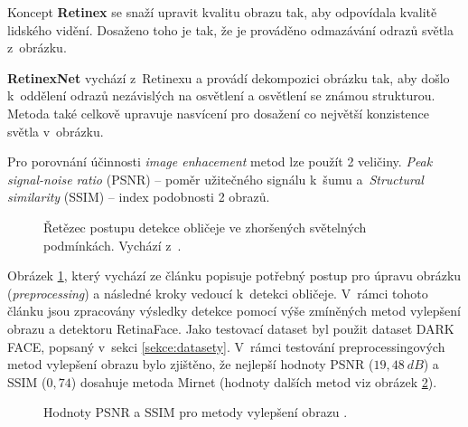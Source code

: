 Koncept \textbf{Retinex} se snaží upravit kvalitu obrazu tak, aby odpovídala kvalitě lidského vidění. Dosaženo toho je tak, že je prováděno odmazávání odrazů světla z~obrázku.

\textbf{RetinexNet} vychází z~Retinexu a provádí dekompozici obrázku tak, aby došlo k~oddělení odrazů nezávislých na osvětlení a osvětlení se známou strukturou. Metoda také celkově upravuje nasvícení pro dosažení co největší konzistence světla v~obrázku.

Pro porovnání účinnosti \emph{image enhacement} metod lze použít 2 veličiny. \emph{Peak signal-noise ratio} (PSNR) -- poměr užitečného signálu k~šumu a~\emph{Structural similarity} (SSIM) -- index podobnosti 2 obrazů.

\begin{figure}[H]
  \begin{center}
  \label{obrazek:iepostup}
  \caption{Řetězec postupu detekce obličeje ve zhoršených světelných podmínkách. Vychází z~\cite{lowLightFdReview}.}
  \end{center}
\end{figure}

Obrázek \ref{obrazek:iepostup}, který vychází ze článku \cite{lowLightFdReview} popisuje potřebný postup pro úpravu obrázku (\emph{preprocessing}) a následné kroky vedoucí k~detekci obličeje. V~rámci tohoto článku jsou zpracovány výsledky detekce pomocí výše zmíněných metod vylepšení obrazu a detektoru RetinaFace. Jako testovací dataset byl použit dataset DARK FACE, popsaný v~sekci \ref{sekce:datasety}. V~rámci testování preprocessingových metod vylepšení obrazu bylo zjištěno, že nejlepší hodnoty PSNR ($19,48\:dB$) a SSIM ($0,74$) dosahuje metoda Mirnet (hodnoty dalších metod viz obrázek \ref{obrazek:psnrssim}).

\begin{figure}[H]
  \begin{center}
  \label{obrazek:psnrssim}
  \caption{Hodnoty PSNR a SSIM pro metody vylepšení obrazu \cite{lowLightFdReview}.}
  \end{center}
\end{figure}

